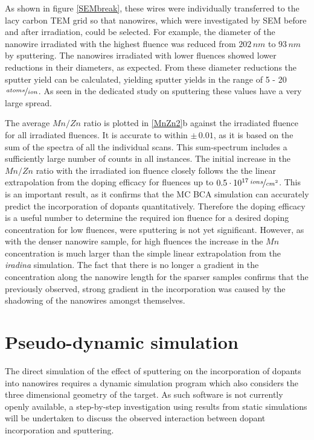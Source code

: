 As shown in figure \ref{SEMbreak}, these wires were individually transferred to the lacy carbon TEM grid so that nanowires, which were investigated by SEM before and after irradiation, could be selected. For example, the diameter of the nanowire irradiated with the highest fluence was reduced from $202\,nm$ to $93\,nm$ by sputtering. The nanowires irradiated with lower fluences showed lower reductions in their diameters, as expected. From these diameter reductions the sputter yield can be calculated, yielding sputter yields in the range of 5 - 20$\,\nicefrac{atoms}{ion}$. As seen in the dedicated study on sputtering these values have a very large spread. 

The average $Mn/Zn$ ratio is plotted in \ref{MnZn2}b against the irradiated fluence for all irradiated fluences. It is accurate to within $\pm\,0.01$, as it is based on the sum of the spectra of all the individual scans. This sum-spectrum includes a sufficiently large number of counts in all instances. The initial increase in the $Mn/Zn$ ratio with the irradiated ion fluence closely follows the the linear extrapolation from the doping efficacy for fluences up to $0.5\cdot 10^{17}\,\nicefrac{ions}{cm^2}$. This is an important result, as it confirms that the MC BCA simulation can accurately predict the incorporation of dopants quantitatively. Therefore the doping efficacy is a useful number to determine the required ion fluence for a desired doping concentration for low fluences, were sputtering is not yet significant. However, as with the denser nanowire sample, for high fluences the increase in the $Mn$ concentration is much larger than the simple linear extrapolation from the \emph{iradina} simulation. The fact that there is no longer a gradient in the concentration along the nanowire length for the sparser samples confirms that the previously observed, strong gradient in the incorporation was caused by the shadowing of the nanowires amongst themselves.


\section{Pseudo-dynamic simulation}

The direct simulation of the effect of sputtering on the incorporation of dopants into nanowires requires a dynamic simulation program which also considers the three dimensional geometry of the target. As such software is not currently openly available, a step-by-step investigation using results from static simulations will be undertaken to discuss the observed interaction between dopant incorporation and sputtering.

